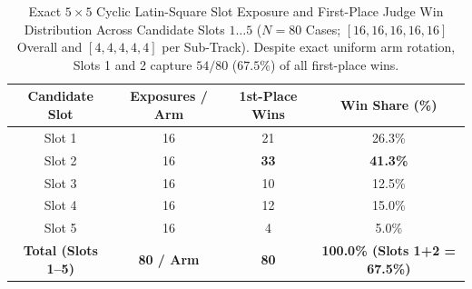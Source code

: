 \documentclass[11pt,a4paper]{article}
\begin{document}
\begin{table}[t]
\centering
\caption{Exact $5\times 5$ Cyclic Latin-Square Slot Exposure and First-Place Judge Win Distribution Across Candidate Slots $1\dots 5$ ($N=80$ Cases; $[16,16,16,16,16]$ Overall and $[4,4,4,4,4]$ per Sub-Track). Despite exact uniform arm rotation, Slots 1 and 2 capture $54/80$ ($67.5\%$) of all first-place wins.}
\label{tab:latinsquare}
\small
\begin{tabular}{@{}cccc@{}}
\toprule
\textbf{Candidate Slot} & \textbf{Exposures / Arm} & \textbf{1st-Place Wins} & \textbf{Win Share (\%)} \\
\midrule
Slot 1 & 16 & 21 & 26.3\% \\
Slot 2 & 16 & \textbf{33} & \textbf{41.3\%} \\
Slot 3 & 16 & 10 & 12.5\% \\
Slot 4 & 16 & 12 & 15.0\% \\
Slot 5 & 16 & 4 & 5.0\% \\
\midrule
\textbf{Total (Slots 1--5)} & \textbf{80 / Arm} & \textbf{80} & \textbf{100.0\% (Slots 1+2 = 67.5\%)} \\
\bottomrule
\end{tabular}
\end{table}
\end{document}
